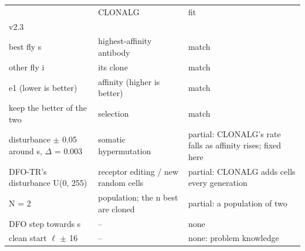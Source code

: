 \begin{tabular}{lll}
\toprule
 & CLONALG & fit \\
v2.3 &  &  \\
\midrule
best fly s & highest-affinity antibody & match \\
other fly i & its clone & match \\
e1 (lower is better) & affinity (higher is better) & match \\
keep the better of the two & selection & match \\
disturbance $\pm$ 0.05 around s, $\Delta$ = 0.003 & somatic hypermutation & partial: CLONALG's rate falls as affinity rises; fixed here \\
DFO-TR's disturbance U(0, 255) & receptor editing / new random cells & partial: CLONALG adds cells every generation \\
N = 2 & population; the n best are cloned & partial: a population of two \\
DFO step towards s & -- & none \\
clean start $\ell$ $\pm$ 16 & -- & none: problem knowledge \\
\bottomrule
\end{tabular}
